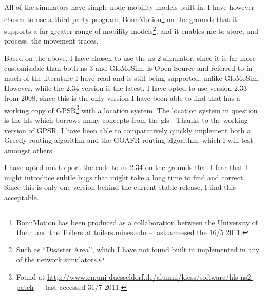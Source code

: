 All of the simulators have simple node mobility models built-in. I have however chosen to use a third-party program, BonnMotion\footnote{BonnMotion has been produced as a collaboration between the University of Bonn and the Toilers at \url{toilers.mines.edu} -- last accessed the 16/5 2011.} on the grounds that it supports a far greater range of mobility models\footnote{Such as ``Disaster Area'', which I have not found built in implemented in any of the network simulators.}, and it enables me to store, and process, the movement traces.

Based on the above, I have chosen to use the ns-2 simulator, since it is far more customisable than both ns-3 and GloMoSim, is Open Source and referred to in much of the literature I have read \cite{directed, gpsr, energyConservation, two-tier} and is still being supported, unlike GloMoSim. However, while the 2.34 version is the latest, I have opted to use version 2.33 from 2008, since this is the only version I have been able to find that has a working copy of GPSR\footnote{Found at \url{http://www.cn.uni-duesseldorf.de/alumni/kiess/software/hls-ns2-patch} --- last accessed 31/7 2011.} with a location system. The location system in question is the \ac{hls} which borrows many concepts from the \ac{gls} \cite{hls}. Thanks to the working version of GPSR, I have been able to comparatively quickly implement both a Greedy routing algorithm and the GOAFR routing algorithm, which I will test amongst others. 

I have opted not to port the code to ns-2.34 on the grounds that I fear that I might introduce subtle bugs that might take a long time to find and correct. Since this is only one version behind the current stable release, I find this acceptable.
